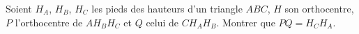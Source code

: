 Soient $H_A$, $H_B$, $H_C$ les pieds des hauteurs d'un triangle $ABC$, $H$ son orthocentre, $P$ l'orthocentre de $AH_BH_C$ et $Q$ celui de $CH_AH_B$. Montrer que $PQ = H_CH_A$.
